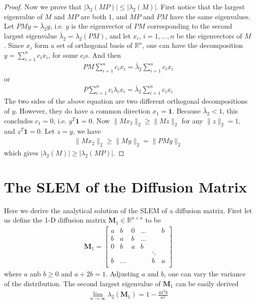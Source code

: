 \begin{proof}
Now we prove that $|\lambda_2(MP)| \le |\lambda_2(M)|$. First notice that the largest eigenvalue of $M$ and $MP$ are both $1$, and $MP$ and $PM$ have the same eigenvalues. Let $PMy=\bar{\lambda}_2 y$, i.e. $y$ is the eigenvector of $PM$ corresponding to the second largest eigenvalue $\bar{\lambda}_2 = \lambda_2(PM)$, and let $x_i$, $i=1,...,n$ be the eigenvectors of $M$. Since $x_i$ form a set of orthogonal basis of $\mathbb{R}^n$, one can have the decomposition $y =\sum_{i=1}^{n}c_{i} x_{i}$, for some $c_i$s. And then
\begin{eqnarray*}
 PM\sum_{i=1}^{n}c_{i} x_{i} = \bar{\lambda}_2 \sum_{i=1}^{n}c_{i} x_{i} 
\end{eqnarray*} 
or
\begin{eqnarray*}
 P\sum_{i=1}^{n}c_{i} \lambda_{i} x_{i} = \bar{\lambda}_2 \sum_{i=1}^{n}c_{i} x_{i} 
\end{eqnarray*}
The two sides of the above equation are two different orthogonal decompositions of $y$. However, they do have a common direction $x_1 = \mathbf{1}$. Because $\bar{\lambda}_2 < 1$, this concludes $c_{1}=0$, i.e. $y^T\mathbf{1}=0$.
Now $\| M x_2\|_2 \ge \|M z\|_2$ for any $\|z\|_2=1$, and $z^T\mathbf{1}=0$. Let $z = y$, we have   
\begin{eqnarray*}
\| M x_2\|_2 \ge \|My\|_2 =\|PMy\|_2
\end{eqnarray*}    
which gives $|\lambda_2(M)| \ge |\lambda_2(MP)|$.

\end{proof}
  
   

\section{The SLEM of the Diffusion Matrix}
Here we derive the analytical solution of the SLEM of a diffusion matrix. First let us define the 1-D diffusion matrix $\mathbf{M}_{1}\in\mathbb{R}^{n\times n}$ to be
\begin{eqnarray*}
  \mathbf{M}_{1} =  \left[
             \begin{matrix}    
               a & b & 0   & ...  &    &  b \\
               b & a & b   & ...  &    &    \\
               0 & b & a   & b    &    &    \\
                 &   &     &      & \ddots & \\
               b & ... &     &    & b  &  a \\
             \end{matrix}  
           \right] 
\end{eqnarray*}
where $a$ anb $b\ge0$ and $a+2b = 1$. Adjusting $a$ and $b$, one can vary the variance of the distribution. The second largest eigenvalue of $\mathbf{M}_{1}$ can be easily derived
\begin{eqnarray*}
 \lim_{n\to\infty}\lambda_{2}(\mathbf{M}_1) = 1-\frac{4\pi^{2}b}{n^2}
\end{eqnarray*}

